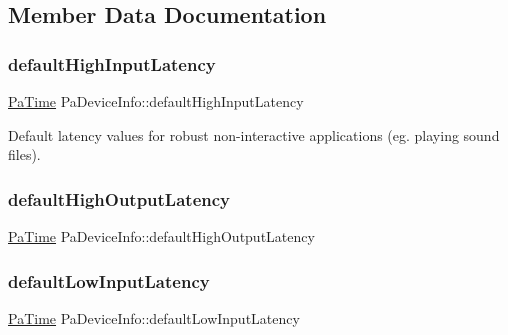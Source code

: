 \subsection{Member Data Documentation}
\mbox{\label{struct_pa_device_info_a4214826038fcaf374beb9816024e6c9f}} 
\subsubsection{\texorpdfstring{default\+High\+Input\+Latency}{defaultHighInputLatency}}
{\footnotesize\ttfamily \hyperlink{portaudio_8h_af17a7e6d0471a23071acf8dbd7bbe4bd}{Pa\+Time} Pa\+Device\+Info\+::default\+High\+Input\+Latency}

Default latency values for robust non-\/interactive applications (eg. playing sound files). \mbox{\label{struct_pa_device_info_a2a43dbc2b158806a937065bda037070e}} 
\subsubsection{\texorpdfstring{default\+High\+Output\+Latency}{defaultHighOutputLatency}}
{\footnotesize\ttfamily \hyperlink{portaudio_8h_af17a7e6d0471a23071acf8dbd7bbe4bd}{Pa\+Time} Pa\+Device\+Info\+::default\+High\+Output\+Latency}

\mbox{\label{struct_pa_device_info_aad6629064b8c7cf043d237ea0a5cc534}} 
\subsubsection{\texorpdfstring{default\+Low\+Input\+Latency}{defaultLowInputLatency}}
{\footnotesize\ttfamily \hyperlink{portaudio_8h_af17a7e6d0471a23071acf8dbd7bbe4bd}{Pa\+Time} Pa\+Device\+Info\+::default\+Low\+Input\+Latency}

